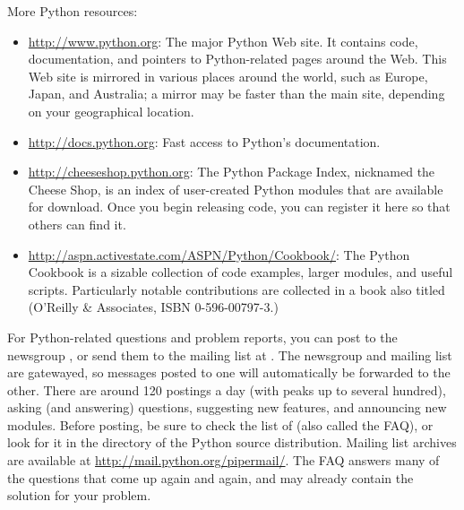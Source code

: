 \documentclass{manual}
\begin{document}
More Python resources:

\begin{itemize}

\item \url{http://www.python.org}:  The major Python Web site.  It contains
code, documentation, and pointers to Python-related pages around the
Web.  This Web site is mirrored in various places around the
world, such as Europe, Japan, and Australia; a mirror may be faster
than the main site, depending on your geographical location. 

\item \url{http://docs.python.org}:  Fast access to Python's 
documentation.

\item \url{http://cheeseshop.python.org}: 
The Python Package Index, nicknamed the Cheese Shop, 
is an index of user-created Python modules that are available for 
download.  Once you begin releasing code, you can register it 
here so that others can find it.

\item \url{http://aspn.activestate.com/ASPN/Python/Cookbook/}: The
Python Cookbook is a sizable collection of code examples, larger
modules, and useful scripts.  Particularly notable contributions are
collected in a book also titled  (O'Reilly
\& Associates, ISBN 0-596-00797-3.)

\end{itemize}


For Python-related questions and problem reports, you can post to the
newsgroup , or send them to the mailing
list at .  The newsgroup and mailing list
are gatewayed, so messages posted to one will automatically be
forwarded to the other.  There are around 120 postings a day (with peaks
up to several hundred),
asking (and answering) questions, suggesting new features, and
announcing new modules.  Before posting, be sure to check the list of
 (also called the FAQ), or look for it in the
 directory of the Python source distribution.  Mailing
list archives are available at \url{http://mail.python.org/pipermail/}.
The FAQ answers many of the questions that come up again and again,
and may already contain the solution for your problem.
\end{document}
